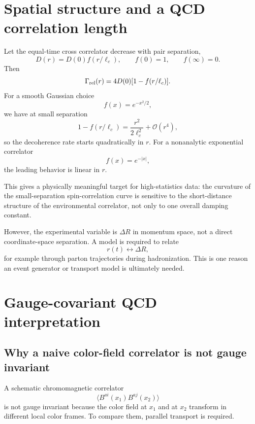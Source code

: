 \documentclass[11pt]{article}
\begin{document}
\section{Spatial structure and a QCD correlation length}

Let the equal-time cross correlator decrease with pair separation,
\begin{equation}
D(r)=D(0)f(r/\ell_c),
\qquad
f(0)=1,
\qquad
f(\infty)=0.
\end{equation}
Then
\begin{equation}
\Gamma_{\rm rel}(r)=4D(0)[1-f(r/\ell_c)].
\end{equation}
For a smooth Gaussian choice
\begin{equation}
f(x)=e^{-x^2/2},
\end{equation}
we have at small separation
\begin{equation}
1-f(r/\ell_c)
=\frac{r^2}{2\ell_c^2}+\mathcal O(r^4),
\end{equation}
so the decoherence rate starts quadratically in $r$. For a nonanalytic exponential correlator
\begin{equation}
f(x)=e^{-|x|},
\end{equation}
the leading behavior is linear in $r$.

This gives a physically meaningful target for high-statistics data: the curvature of the small-separation spin-correlation curve is sensitive to the short-distance structure of the environmental correlator, not only to one overall damping constant.

However, the experimental variable is $\Delta R$ in momentum space, not a direct coordinate-space separation. A model is required to relate
\begin{equation}
r(t)\leftrightarrow \Delta R,
\end{equation}
for example through parton trajectories during hadronization. This is one reason an event generator or transport model is ultimately needed.

\section{Gauge-covariant QCD interpretation}

\subsection{Why a naive color-field correlator is not gauge invariant}

A schematic chromomagnetic correlator
\begin{equation}
\langle B^{ai}(x_1)B^{aj}(x_2)\rangle
\end{equation}
is not gauge invariant because the color field at $x_1$ and at $x_2$ transform in different local color frames. To compare them, parallel transport is required.
\end{document}
